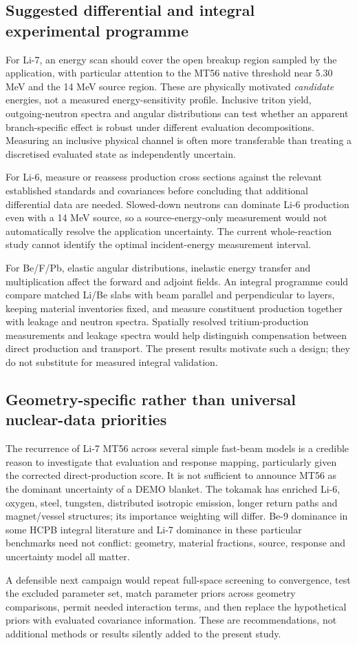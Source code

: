 \subsection{Suggested differential and integral experimental programme}
For Li-7, an energy scan should cover the open breakup region sampled by the application, with particular attention to the MT56 native threshold near 5.30 MeV and the 14 MeV source region. These are physically motivated \emph{candidate} energies, not a measured energy-sensitivity profile. Inclusive triton yield, outgoing-neutron spectra and angular distributions can test whether an apparent branch-specific effect is robust under different evaluation decompositions. Measuring an inclusive physical channel is often more transferable than treating a discretised evaluated state as independently uncertain.

For Li-6, measure or reassess production cross sections against the relevant established standards and covariances before concluding that additional differential data are needed. Slowed-down neutrons can dominate Li-6 production even with a 14 MeV source, so a source-energy-only measurement would not automatically resolve the application uncertainty. The current whole-reaction study cannot identify the optimal incident-energy measurement interval.

For Be/F/Pb, elastic angular distributions, inelastic energy transfer and multiplication affect the forward and adjoint fields. An integral programme could compare matched Li/Be slabs with beam parallel and perpendicular to layers, keeping material inventories fixed, and measure constituent production together with leakage and neutron spectra. Spatially resolved tritium-production measurements and leakage spectra would help distinguish compensation between direct production and transport. The present results motivate such a design; they do not substitute for measured integral validation.

\subsection{Geometry-specific rather than universal nuclear-data priorities}
The recurrence of Li-7 MT56 across several simple fast-beam models is a credible reason to investigate that evaluation and response mapping, particularly given the corrected direct-production score. It is not sufficient to announce MT56 as the dominant uncertainty of a DEMO blanket. The tokamak has enriched Li-6, oxygen, steel, tungsten, distributed isotropic emission, longer return paths and magnet/vessel structures; its importance weighting will differ. Be-9 dominance in some HCPB integral literature \citep{hcpbsensitivity} and Li-7 dominance in these particular benchmarks need not conflict: geometry, material fractions, source, response and uncertainty model all matter.

A defensible next campaign would repeat full-space screening to convergence, test the excluded parameter set, match parameter priors across geometry comparisons, permit needed interaction terms, and then replace the hypothetical priors with evaluated covariance information. These are recommendations, not additional methods or results silently added to the present study.
